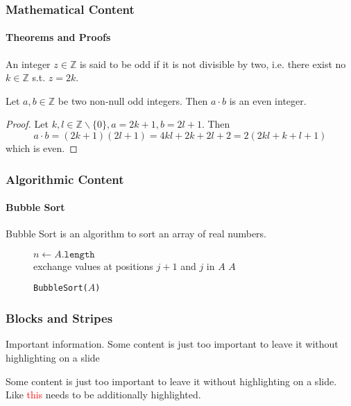 	\begin{framefont}{\small}
	\begin{frame}
	    \frametitle{Mathematical Content}
	    \framesubtitle{Theorems and Proofs}

	    \begin{definition}
	    An integer $z \in \mathbb{Z}$ is said to be odd if it is not divisible by two, i.e. there exist no $k \in \mathbb Z$ s.t. $z = 2k$.
	    \end{definition}

	    \begin{theorem}
	    Let $a, b \in \mathbb Z$ be two non-null odd integers. Then $a \cdot b$ is an even integer.
	    \end{theorem}

	    \begin{proof}
	    Let $k, l \in \mathbb{Z} \backslash \{0\}, a = 2k+1, b = 2l+1$. Then
	    $$
	    a \cdot b = (2k+1)(2l+1) = 4kl + 2k + 2l + 2 = 2(2kl + k + l + 1)
	    $$
	    which is even.
	    \end{proof}
	\end{frame}
	\end{framefont}

	\begin{frame}
	    \frametitle{Algorithmic Content}
	    \framesubtitle{Bubble Sort}
	    Bubble Sort is an algorithm to sort an array of real numbers.
	    \vspace{1em}

	    \begin{figure}
    	    \centering
    	    \begin{algorithm}[H]
    	        \caption{\texttt{BubbleSort($A$)}}
        	    $n \leftarrow A.\texttt{length}$\\
        	    \For{$i=1$ to $n$}
        	    {
        	    \For{$j=0$ to $n-i$}
        	    {
        	    \If{$A[j+1] < A[j]$}
        	    {
        	    exchange values at positions $j+1$ and $j$ in $A$
        	    }
        	    }
        	    }
        	    \Return $A$
    	    \end{algorithm}
	    \end{figure}
	\end{frame}

	\begin{frame}
	    \frametitle{Blocks and Stripes}

	    \begin{block}{Important information.}
	    Some content is just too important to leave it without highlighting on a slide
	    \end{block}

	    \begin{stripe}
	    Some content is just too important to leave it without highlighting on a slide. Like \textcolor{red}{this} needs to be additionally highlighted.
	    \end{stripe}
	 \end{frame}

